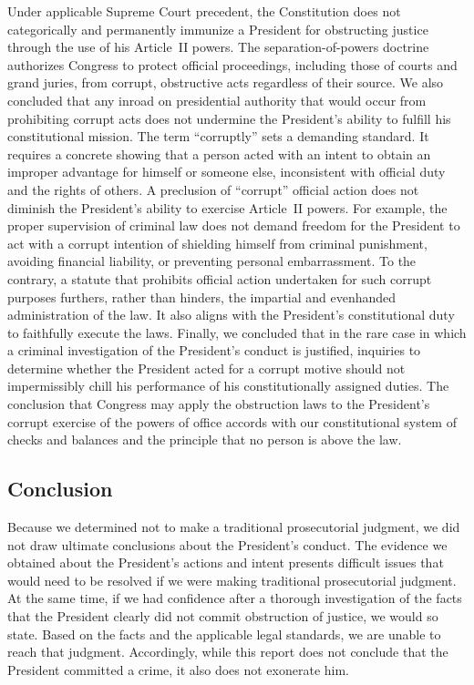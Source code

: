 Under applicable Supreme Court precedent, the Constitution does not categorically and permanently immunize a President for obstructing justice through the use of his Article~II powers.
The separation-of-powers doctrine authorizes Congress to protect official proceedings, including those of courts and grand juries, from corrupt, obstructive acts regardless of their source.
We also concluded that any inroad on presidential authority that would occur from prohibiting corrupt acts does not undermine the President's ability to fulfill his constitutional mission.
The term ``corruptly'' sets a demanding standard.
It requires a concrete showing that a person acted with an intent to obtain an improper advantage for himself or someone else, inconsistent with official duty and the rights of others.
A preclusion of ``corrupt'' official action does not diminish the President's ability to exercise Article~II powers.
For example, the proper supervision of criminal law does not demand freedom for the President to act with a corrupt intention of shielding himself from criminal punishment, avoiding financial liability, or preventing personal embarrassment.
To the contrary, a statute that prohibits official action undertaken for such corrupt purposes furthers, rather than hinders, the impartial and evenhanded administration of the law.
It also aligns with the President's constitutional duty to faithfully execute the laws.
Finally, we concluded that in the rare case in which a criminal investigation of the President's conduct is justified, inquiries to determine whether the President acted for a corrupt motive should not impermissibly chill his performance of his constitutionally assigned duties.
The conclusion that Congress may apply the obstruction laws to the President's corrupt exercise of the powers of office accords with our constitutional system of checks and balances and the principle that no person is above the law.

\subsection*{Conclusion}

Because we determined not to make a traditional prosecutorial judgment, we did not draw ultimate conclusions about the President's conduct.
The evidence we obtained about the President's actions and intent presents difficult issues that would need to be resolved if we were making traditional prosecutorial judgment.
At the same time, if we had confidence after a thorough investigation of the facts that the President clearly did not commit obstruction of justice, we would so state.
Based on the facts and the applicable legal standards, we are unable to reach that judgment.
Accordingly, while this report does not conclude that the President committed a crime, it also does not exonerate him.
